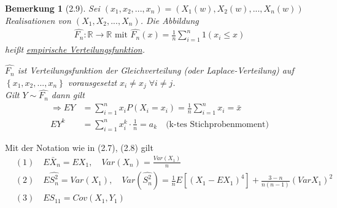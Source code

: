 \documentclass[a4paper,openany]{book}
\theoremstyle{mytheoremstyle}
\newtheorem*{bem}{Bemerkung}
\theoremstyle{mytheoremstyle2}
\begin{document}
\begin{bem}[2.9]
  Sei $(x_1,x_2,...,x_n)=(X_1(w),X_2(w),...,X_n(w))$ Realisationen von $(X_1,X_2,...,X_n)$. Die Abbildung
  \begin{align*}
    \hat{F_n}:\mathbb{R} \to \mathbb{R} \text{ mit }\hat{F_n}(x)=\frac{1}{n}\sum_{i=1}^{n}{1(x_i \leq x)}
  \end{align*}
  heißt \underline{empirische Verteilungsfunktion}.
  \begin{center}
  \end{center}
  $\hat{F_n}$ ist Verteilungsfunktion der Gleichverteilung (oder Laplace-Verteilung) auf $\left\{x_1,x_2,...,x_n\right\}$ vorausgesetzt $x_i \neq x_j\;\forall i\neq j$. \\
  Gilt $Y\sim \hat{F_n}$ dann gilt    \begin{align*}
    \Rightarrow EY&=\sum_{i=1}^{n}{x_iP(X_i=x_i)}=\frac{1}{n}\sum_{i=1}^{n}{x_i}=\bar{x} \\
    EY^k&=\sum_{i=1}^{n}{x_i^k \cdot \frac{1}{n}}=a_k\quad \text{(k-tes Stichprobenmoment)
}
  \end{align*}
\end{bem}
\begin{theo}{2.10}{}
  Mit der Notation wie in (2.7), (2.8) gilt
  \begin{align*}
    &(1)\quad E \bar{X}_n=EX_1,\quad Var(X_n)=\frac{Var(X_1)}{n}\\
    &(2)\quad E \hat{S_n^2}=Var(X_1),\quad Var(\hat{S_n^2})=\frac{1}{n}E[(X_1-EX_1)^4]+\frac{3-n}{n(n-1)}(VarX_1)^2 \\
    &(3)\quad ES _{11}=Cov(X_1,Y_1)
  \end{align*}
\end{theo}
\end{document}
